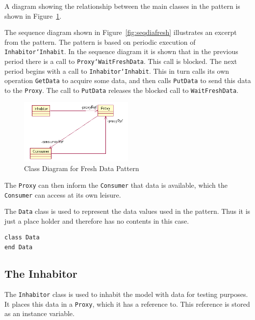\documentclass{overturerepchap}
\begin{document}
A diagram showing the relationship between the main classes in the
pattern is shown in Figure~\ref{fig:freshdata}.

The sequence diagram shown in Figure~\ref{fig:seqdiafresh} illustrates
an excerpt from the pattern. The pattern is based on periodic
execution of \texttt{Inhabitor`Inhabit}. In the sequence diagram it is
shown that in the previous period there is a call to
\texttt{Proxy`WaitFreshData}. This call is blocked. The next period
begins with a call to \texttt{Inhabitor`Inhabit}. This in turn calls
its own operation \texttt{GetData} to acquire some data, and then
calls \texttt{PutData} to send this data to the \texttt{Proxy}. The call to
\texttt{PutData} releases the blocked call to \texttt{WaitFreshData}.

\begin{figure}
\begin{center}
\includegraphics[width=0.5\textwidth]{figures/freshdata.png}
\end{center}
\caption{Class Diagram for Fresh Data Pattern\label{fig:freshdata}}
\end{figure}

The \texttt{Proxy} can then inform the \texttt{Consumer} that data is
available, which the \texttt{Consumer} can access at its own leisure.

The \texttt{Data} class is used to represent the data values used in
the pattern. Thus it is just a place holder and therefore has no
contents in this case.

\begin{lstlisting}
class Data
end Data
\end{lstlisting}

\subsection{The Inhabitor}

The \texttt{Inhabitor} class is used to inhabit the model with data
for testing purposes. It places this data in a \texttt{Proxy}, which
it has a reference to. This reference is stored as an instance
variable.
\end{document}

